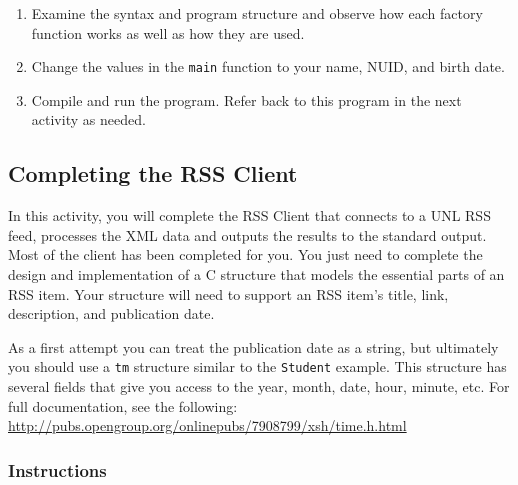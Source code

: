 \documentclass[12pt]{scrartcl}
\begin{document}
\begin{enumerate}
  \item Examine the syntax and program structure and observe how 
	each factory function works as well as how they are used.
  \item Change the values in the \texttt{main} function to your 
	name, NUID, and birth date.
  \item Compile and run the program.  Refer back to this program in 
	the next activity as needed.
\end{enumerate}
	
\subsection{Completing the RSS Client}

In this activity, you will complete the RSS Client that connects to a UNL 
RSS feed, processes the XML data and outputs the results to the 
standard output.  Most of the client has been completed for you.  
You just need to complete the design and implementation of a C 
structure that models the essential parts of an RSS item.  Your 
structure will need to support an RSS item's title, link, description, 
and publication date.  

As a first attempt you can treat the publication date as a string, 
but ultimately you should use a \texttt{tm} structure similar 
to the \texttt{Student} example.  This structure has several 
fields that give you access to the year, month, date, hour, minute, 
etc.  For full documentation, see the following: \url{http://pubs.opengroup.org/onlinepubs/7908799/xsh/time.h.html}

\subsubsection*{Instructions}
\end{document}
